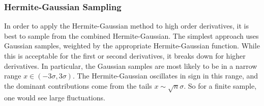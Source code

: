 \subsubsection{Hermite-Gaussian Sampling}

In order to apply the Hermite-Gaussian method to high order derivatives, it is best to 
sample from the combined Hermite-Gaussian.  The simplest approach uses Gaussian samples, weighted
by the appropriate Hermite-Gaussian function.  While this is acceptable for the first or second derivatives,
it breaks down for higher derivatives.  In particular, the Gaussian samples are most likely to be in a narrow
range $x\in(-3\sigma,3\sigma)$.  The Hermite-Gaussian oscillates in sign in this range, and
the dominant contributions come from the tails $x\sim \sqrt{n}\sigma$.  So for a finite sample,
one would see large fluctuations.  

